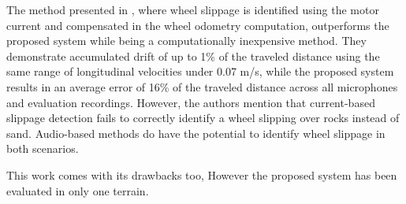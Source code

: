 The method presented in  \cite{Ojeda2006}, where wheel
slippage is identified using the motor current and compensated in the wheel
odometry computation, outperforms the proposed system while being a
computationally inexpensive method. They demonstrate accumulated drift of up to
1\% of the traveled distance using the same range of longitudinal velocities
under 0.07 m/s, while the proposed system results in an average error of 16\%
of the traveled distance across all microphones and evaluation recordings.
However, the authors mention that current-based slippage detection fails to
correctly identify a wheel slipping over rocks instead of sand. Audio-based
methods do have the potential to identify wheel slippage in both scenarios.

This work comes with its drawbacks too, However the proposed system has been
evaluated in only one terrain.



